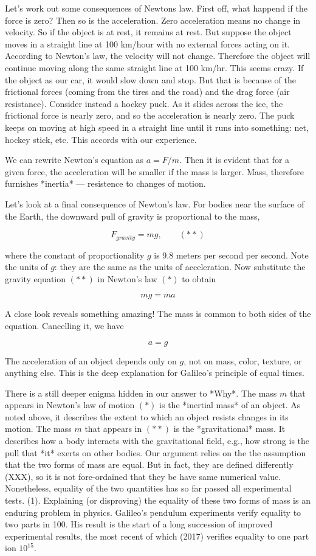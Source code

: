 Let's work out some consequences of Newtons law. First off, what happend if the force is zero? Then so is the acceleration.  Zero acceleration means no change in velocity.  So if the object is at rest, it remains at rest.  But suppose the object moves in a straight line at 100 km/hour with no external forces acting on it.  According to Newton's law, the velocity will not change.  Therefore the object will continue moving along the same straight line at 100 km/hr.  This seems crazy.  If the object as our car, it would slow down and stop.  But that is because of the frictional forces (coming from the tires and the road) and the drag force (air resistance).  Consider instead a hockey puck.  As it slides across the ice, the frictional force is nearly zero, and so the acceleration is nearly zero. The puck keeps on moving at high speed in a straight line until it runs into something: net, hockey stick, etc.  This accords with our experience.

We can rewrite Newton's equation as $a = F/m$.  Then it is evident that for a given force, the acceleration will be smaller if the mass is larger.  Mass, therefore furnishes *inertia* — resistence to changes of motion. 


Let's look at a final consequence of Newton's law.  For bodies near the surface of the Earth, the downward pull of gravity is proportional to the mass,

$$
F_{gravity} = mg, \qquad (**)
$$

where the constant of proportionality $g$ is 9.8 meters per second per second.  Note the units of $g$: they are the same as the units of acceleration.  Now substitute the gravity equation  $(**)$ in Newton's law $(*)$ to obtain

$$
mg = ma
$$

A close look reveals something amazing!  The mass is common to both sides of the equation.  Cancelling it, we have

$$
a = g
$$

The acceleration of an object depends only on $g$, not on mass, color, texture, or anything else. This is the deep explanation for Galileo's principle of equal times. 


There is a still deeper enigma hidden in our answer to *Why*.  The mass $m$ that appears in Newton's law of motion $(*)$ is the *inertial mass* of an object.  As noted above, it describes the extent to which an object resists changes in its motion.  The mass $m$ that appears in $(**)$ is the *gravitational* mass.  It describes how a body interacts with the gravitational field, e.g., how strong is the pull that *it* exerts on other bodies.  Our argument relies on the the assumption that the two forms of mass are equal.  But in fact, they are defined differently (XXX), so it is not fore-ordained that they be have same numerical value. Nonetheless, equality of the two quantities has so far passed all experimental tests. (1). Explaining (or disproving) the equality of these two forms of mass is an enduring problem in physics.  Galileo's pendulum experiments verify equality to two parts in 100.  His result is the start of a long succession of improved experimental results, the most recent of which (2017) verifies equality to one part ion $10^{15}$.


